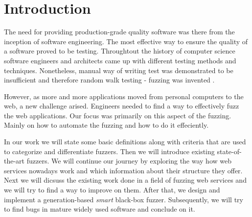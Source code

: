 \chapter{Introduction}
The need for providing production-grade quality software was there from the inception of software engineering. The most effective way to ensure the quality of a software proved to be testing. Throughtout the history of computer science software engineers and architects came up with different testing methods and techniques. Nonetheless, manual way of writing test was demonstrated to be insufficient and therefore random walk testing - fuzzing was invented \cite{miller1990empirical}.

However, as more and more applications moved from personal computers to the web, a new challenge arised. Engineers needed to find a way to effectively fuzz the web applications. Our focus was primarily on this aspect of the fuzzing. Mainly on how to automate the fuzzing and how to do it effeciently.

In our work we will state some basic definitions along with criteria that are used to categorize and differentiate fuzzers. Then we will introduce existing state-of-the-art fuzzers. We will continue our journey by exploring the way how web services nowadays work and which information about their structure they offer. Next we will dicsuss the existing work done in a field of fuzzing web services and we will try to find a way to improve on them. After that, we design and implement a generation-based \textit{smart} black-box fuzzer. Subsequently, we will try to find bugs in mature widely used software and conclude on it.
